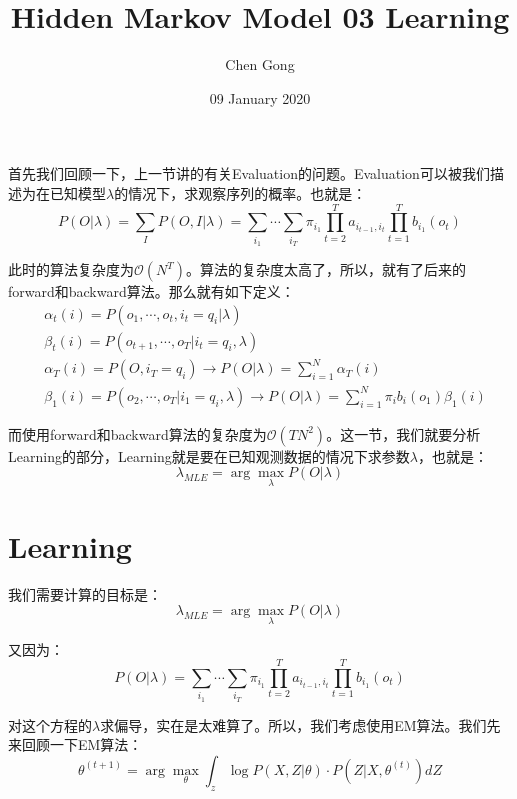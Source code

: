 \documentclass[a4paper]{article}
\title{Hidden Markov Model 03 Learning}
\author{Chen Gong}
\date{09 January 2020}
\begin{document}
\maketitle
首先我们回顾一下，上一节讲的有关Evaluation的问题。Evaluation可以被我们描述为在已知模型$\lambda$的情况下，求观察序列的概率。也就是：
\begin{equation}
    P(O|\lambda) = \sum_I P(O,I|\lambda) = \sum_{i_1}\cdots\sum_{i_T} \pi_{i_1} \prod_{t=2}^T a_{i_{t-1},i_{t}} \prod_{t=1}^T b_{i_1}(o_t)
\end{equation}

此时的算法复杂度为$\mathcal{O}(N^T)$。算法的复杂度太高了，所以，就有了后来的forward和backward算法。那么就有如下定义：
\begin{equation}
    \begin{split}
        & \alpha_t(i) = P(o_1,\cdots,o_t,i_t=q_i|\lambda) \\
        & \beta_t(i) = P(o_{t+1}, \cdots, o_T|i_t=q_i,\lambda) \\
        & \alpha_T(i) = P(O,i_T=q_i) \rightarrow P(O|\lambda) = \sum_{i=1}^N \alpha_{T}(i) \\
        & \beta_1(i) = P(o_2,\cdots,o_T|i_1=q_i,\lambda) \rightarrow P(O|\lambda) = \sum_{i=1}^N \pi_i b_i(o_1)\beta_1(i)
    \end{split}
\end{equation}

而使用forward和backward算法的复杂度为$\mathcal{O}(TN^2)$。这一节，我们就要分析Learning的部分，Learning就是要在已知观测数据的情况下求参数$\lambda$，也就是：
\begin{equation}
    \lambda_{MLE} = \arg\max_{\lambda} P(O|\lambda)
\end{equation}

\section{Learning}
我们需要计算的目标是：
\begin{equation}
    \lambda_{MLE} = \arg\max_{\lambda} P(O|\lambda)
\end{equation}

又因为：
\begin{equation}
    P(O|\lambda) =  \sum_{i_1}\cdots\sum_{i_T} \pi_{i_1} \prod_{t=2}^T a_{i_{t-1},i_{t}} \prod_{t=1}^T b_{i_1}(o_t)
\end{equation}

对这个方程的$\lambda$求偏导，实在是太难算了。所以，我们考虑使用EM算法。我们先来回顾一下EM算法：
\begin{equation}
    \theta^{(t+1)} = \arg\max_\theta \int_z \log P(X,Z|\theta)\cdot P(Z|X,\theta^{(t)}) dZ
\end{equation}
\end{document}

